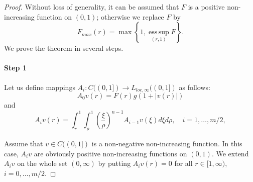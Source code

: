 \documentclass[10pt,a4paper]{amsart}
\begin{document}
\begin{proof}
Without loss of generality, it can be assumed that $F$ is a positive non-increasing function on $(0, 1)$; otherwise we replace $F$ by 
$$
	F_{max} (r)
	=
	\max
	\left\{ 
		1,
		\operatorname*{ess\,sup}_{(r, 1)}
		F
	\right\}.
$$
We prove the theorem in several steps.
\paragraph{Step 1} 
Let us define mappings $A_i : C ((0, 1]) \to L_{loc, \infty} ((0, 1])$ as follows:
$$
	A_0 v (r) = F (r) g (1 +|v (r)|)
$$
and
$$
	A_i v (r)
	=
	\int_r^1
	\int_\rho^1
	\left(
		\frac{\xi}{\rho}
	\right)^{n - 1}
	A_{i - 1} v (\xi)
	d\xi
	d\rho,
	\quad
	i = 1, \ldots, m / 2,
$$

Assume that $v \in C ((0, 1])$ is a non-negative non-increasing function.
In this case, $A_i v$ are obviously positive non-increasing functions on $(0, 1)$.
We extend $A_i v$ on the whole set $(0, \infty)$ by putting $A_i v (r) = 0$ for all $r \in [1, \infty)$, $i = 0, \ldots, m / 2$.


\end{proof}
\end{document}
